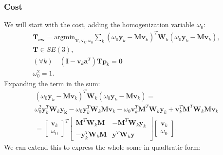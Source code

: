 \documentclass{article}
\begin{document}
\subsubsection{Cost}

We will start with the cost, adding the homogenization variable $\omega_0$:
\begin{align}
\mathbf{T_{cw}} = \text{argmin}_{\mathbf{T}, \mathbf{v}_k, \omega_0} \sum_k (\omega_0\mathbf{y}_k - \mathbf{M} \mathbf{v}_k)^T \mathbf{W}_k (\omega_0 \mathbf{y}_k - \mathbf{M} \mathbf{v}_k),\\
\mathbf{T} \in SE(3),\\
(\forall k) \quad (\mathbf{I} - \mathbf{v}_k \mathbf{a}^T)\mathbf{T}\mathbf{p}_k = \mathbf{0}\\
\omega_0^2 = 1.
\end{align}
Expanding the term in the sum:
\begin{align}
(\omega_0\mathbf{y}_k - \mathbf{M} \mathbf{v}_k)^T \mathbf{W}_k (\omega_0 \mathbf{y}_k - \mathbf{M} \mathbf{v}_k) = \\
\omega_0^2 \mathbf{y}_k^T \mathbf{W}_k \mathbf{y_k} - \omega_0\mathbf{y}_k^T \mathbf{W}_k \mathbf{M} \mathbf{v}_k - \omega_0  \mathbf{v}_k^T\mathbf{M}^T\mathbf{W}_k \mathbf{y}_k + \mathbf{v}_k^T\mathbf{M}^T\mathbf{W}_k \mathbf{M} \mathbf{v}_k\\
=
\begin{bmatrix} 
    \mathbf{v}_k \\
    \omega_0
\end{bmatrix}^T
\begin{bmatrix}
    \mathbf{M}^T\mathbf{W}_k \mathbf{M}     & -\mathbf{M}^T \mathbf{W}_k \mathbf{y}_k \\
    -\mathbf{y}_k^T \mathbf{W}_k \mathbf{M} & \mathbf{y}^T \mathbf{W}_k \mathbf{y}
\end{bmatrix}
\begin{bmatrix}
    \mathbf{v}_k \\
    \omega_0
\end{bmatrix}.
\end{align}
We can extend this to express the whole some in quadtratic form:
\end{document}
